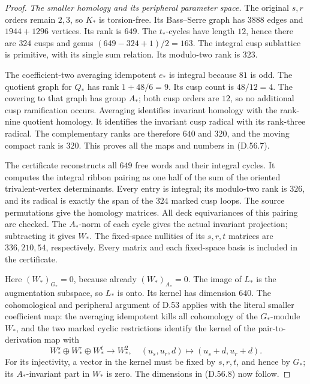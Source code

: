 \begin{proof}
\emph{The smaller homology and its peripheral parameter space.}
The original \(s,r\) orders remain \(2,3\), so \(K_*\)
is torsion-free. Its Bass--Serre graph has \(3888\)
edges and \(1944+1296\) vertices. Its rank is \(649\).
The \(t_*\)-cycles have length \(12\), hence there are
\(324\) cusps and genus
\((649-324+1)/2=163\).
The integral cusp sublattice is primitive, with its
single sum relation. Its modulo-two rank is \(323\).

The coefficient-two averaging idempotent \(e_*\)
is integral because \(81\) is odd.
The quotient graph for \(Q_*\) has rank
\(1+48/6=9\). Its cusp count is \(48/12=4\).
The covering to that graph has group \(A_*\);
both cusp orders are \(12\), so no additional
cusp ramification occurs.
Averaging identifies invariant homology with the
rank-nine quotient homology. It identifies the
invariant cusp radical with its rank-three radical.
The complementary ranks are therefore \(640\)
and \(320\), and the moving compact rank is \(320\).
This proves all the maps and numbers in (D.56.7).

The certificate reconstructs all \(649\) free words
and their integral cycles. It computes the integral
ribbon pairing as one half of the sum of the oriented
trivalent-vertex determinants. Every entry is integral;
its modulo-two rank is \(326\), and its radical is
exactly the span of the \(324\) marked cusp loops.
The source permutations give the homology matrices.
All deck equivariances of this pairing are checked.
The \(A_*\)-norm of each cycle gives the actual
invariant projection; subtracting it gives \(W_*\).
The fixed-space nullities of its \(s,r,t\) matrices
are \(336,210,54\), respectively.
Every matrix and each fixed-space basis is included
in the certificate.

Here \((W_*)_{G_*}=0\), because already
\((W_*)_{A_*}=0\). The image of \(L_*\) is the
augmentation subspace, so \(L_*\) is onto.
Its kernel has dimension \(640\).
The cohomological and peripheral argument of D.53
applies with the literal smaller coefficient map:
the averaging idempotent kills all cohomology of
the \(G_*\)-module \(W_*\), and the two marked
cyclic restrictions identify the kernel of the
pair-to-derivation map with
\[
             W_*^s\oplus W_*^r\oplus W_*^t
        \longrightarrow W_*^2,\quad
             (u_s,u_r,d)\longmapsto(u_s+d,u_r+d).
 \tag{D.56.20}
\]
For its injectivity, a vector in the kernel must be
fixed by \(s,r,t\), and hence by \(G_*\); its
\(A_*\)-invariant part in \(W_*\) is zero.
The dimensions in (D.56.8) now follow.


\end{proof}
